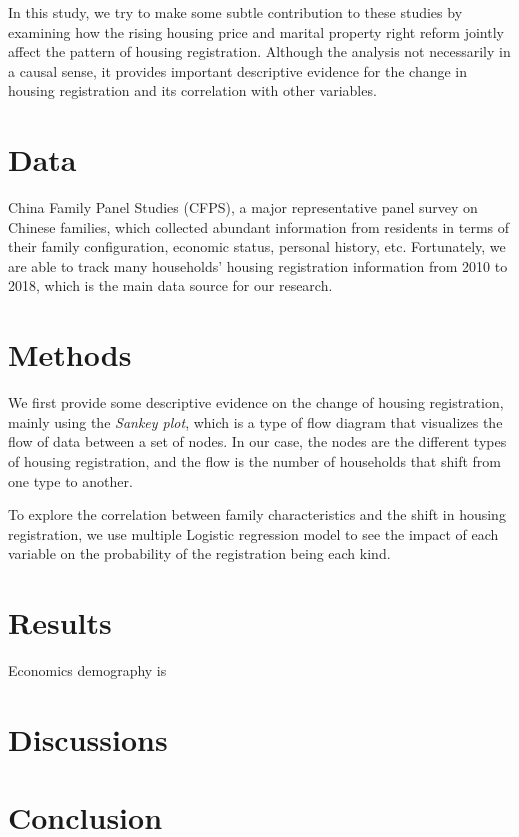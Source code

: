 \documentclass[11pt]{article}
\begin{document}
In this study, we try to make some subtle contribution to these studies by examining how the rising housing price and marital property right reform jointly affect the pattern of housing registration. Although the analysis not necessarily in a causal sense, it provides important descriptive evidence for the change in housing registration and its correlation with other variables.


\section{Data} \label{sec:data}

China Family Panel Studies (CFPS), a major representative panel survey on Chinese families, which collected abundant information from residents in terms of their family configuration, economic status, personal history, etc. Fortunately, we are able to track many households' housing registration information from 2010 to 2018, which is the main data source for our research. 

\section{Methods} \label{sec:method}

We first provide some descriptive evidence on the change of housing registration, mainly using the \textit{Sankey plot}, which is a type of flow diagram that visualizes the flow of data between a set of nodes. In our case, the nodes are the different types of housing registration, and the flow is the number of households that shift from one type to another.

To explore the correlation between family characteristics and the shift in housing registration, we use multiple Logistic regression model to see the impact of each variable on the probability of the registration being each kind.

\section{Results} \label{sec:result}
Economics demography is 

\section{Discussions} \label{sec:discussion}

\section{Conclusion} \label{sec:conclusion}
\end{document}
